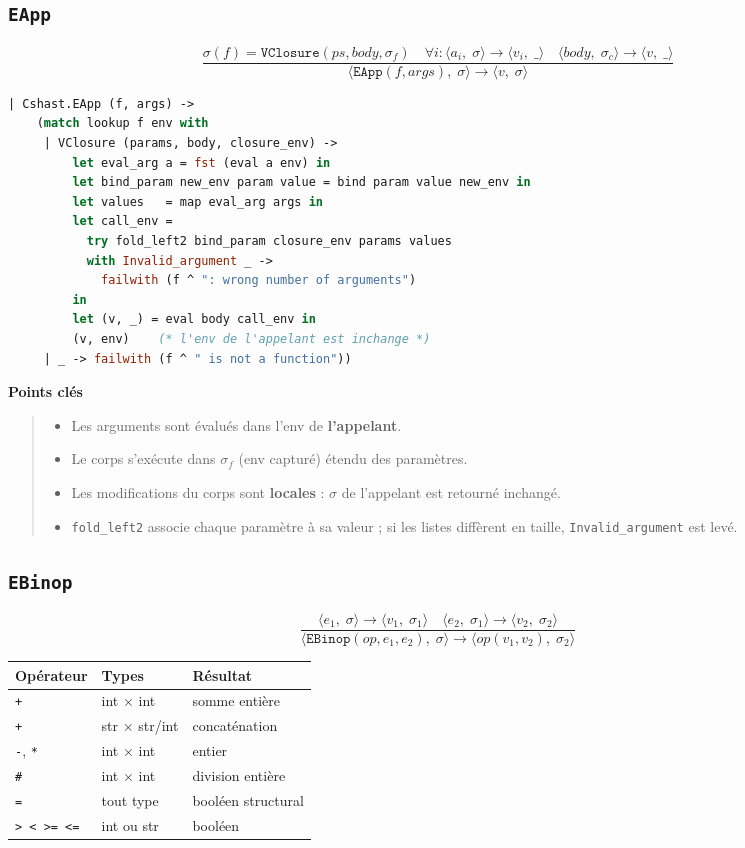 \documentclass[11pt,a4paper]{article}
\newcommand{\sem}[4]{%
  \langle #1,\;#2\rangle \rightarrow \langle #3,\;#4\rangle}
\newcommand{\irule}[2]{%
  \dfrac{\displaystyle #1}{\displaystyle #2}
}
\newcommand{\V}[1]{\mathtt{#1}}
\newenvironment{bloc}[1]
{
  \par\medskip
  \noindent\textbf{#1}
  \par
  \smallskip
  \begin{quote}
}
{
  \end{quote}
  \medskip
}
\begin{document}
\subsection{\texttt{EApp}}

\[
\irule{
\sigma(f)=\V{VClosure}(ps,body,\sigma_f)
\quad
\forall i:\sem{a_i}{\sigma}{v_i}{\_}
\quad
\sem{body}{\sigma_c}{v}{\_}
}{
\sem{\V{EApp}(f,args)}{\sigma}{v}{\sigma}
}
\]

\begin{lstlisting}[language=ml]
| Cshast.EApp (f, args) ->
    (match lookup f env with
     | VClosure (params, body, closure_env) ->
         let eval_arg a = fst (eval a env) in
         let bind_param new_env param value = bind param value new_env in
         let values   = map eval_arg args in
         let call_env =
           try fold_left2 bind_param closure_env params values
           with Invalid_argument _ ->
             failwith (f ^ ": wrong number of arguments")
         in
         let (v, _) = eval body call_env in
         (v, env)    (* l'env de l'appelant est inchange *)
     | _ -> failwith (f ^ " is not a function"))
\end{lstlisting}

\begin{bloc}{Points clés}
\begin{itemize}
  \item Les arguments sont évalués dans l'env de \textbf{l'appelant}.
  \item Le corps s'exécute dans $\sigma_f$ (env capturé) étendu des paramètres.
  \item Les modifications du corps sont \textbf{locales} : $\sigma$ de l'appelant est retourné inchangé.
  \item \texttt{fold\_left2} associe chaque paramètre à sa valeur ; si les listes diffèrent en taille, \texttt{Invalid\_argument} est levé.
\end{itemize}
\end{bloc}

\subsection{\texttt{EBinop}}

\[
\irule{
\sem{e_1}{\sigma}{v_1}{\sigma_1}
\quad
\sem{e_2}{\sigma_1}{v_2}{\sigma_2}
}{
\sem{
\V{EBinop}(op,e_1,e_2)
}{
\sigma
}{
op(v_1,v_2)
}{
\sigma_2
}
}
\]

\begin{center}
\begin{tabular}{|l|l|l|}
\hline
Opérateur & Types & Résultat \\
\hline
\texttt{+} & int $\times$ int & somme entière \\
\texttt{+} & str $\times$ str/int & concaténation \\
\texttt{-}, \texttt{*} & int $\times$ int & entier \\
\texttt{\#} & int $\times$ int & division entière \\
\texttt{=} & tout type & booléen structural \\
\texttt{> < >= <=} & int ou str & booléen \\
\hline
\end{tabular}
\end{center}
\end{document}
